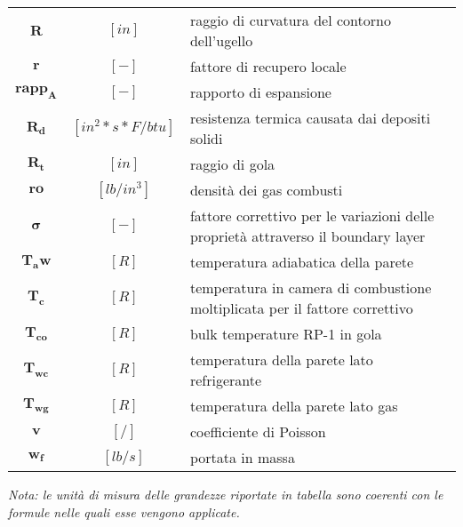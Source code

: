 \begin{multicols}{2}
\begin{tabularx}{\linewidth}{ccX}
		$\bm{R}$ & $[in]$ & raggio di curvatura del contorno dell'ugello \\
		$\bm{r}$ & $[-]$ & fattore di recupero locale \\
		$\bm{rapp_A}$ & $[-]$ & rapporto di espansione \\
		$\bm{R_d}$ & $[in^2*s*F/btu]$ & resistenza termica causata dai depositi solidi \\
		$\bm{R_t}$ & $[in]$ & raggio di gola \\
		$\bm{ro}$ & $[lb/in^3]$ & densità dei gas combusti \\
		$\bm{\sigma}$ & $[-]$ & fattore correttivo per le variazioni delle proprietà attraverso  il boundary layer \\
		$\bm{T_aw}$ & $[R]$ & temperatura adiabatica della parete \\
		$\bm{T_c}$ & $[R]$ & temperatura in camera di combustione moltiplicata per il fattore correttivo \\
		$\bm{T_{co}}$ & $[R]$ & bulk temperature RP-1 in gola \\
		$\bm{T_{wc}}$ & $[R]$ & temperatura della parete lato refrigerante\\
		$\bm{T_{wg}}$ & $[R]$ & temperatura della parete lato gas \\
		$\bm{v}$ & $[/]$ & coefficiente di Poisson \\
		$\bm{w_f}$ & $[lb/s]$ & portata in massa \\
	\end{tabularx}
\end{multicols}

\textit{Nota: le unità di misura delle grandezze riportate in tabella sono coerenti con le formule nelle quali esse vengono applicate.}

